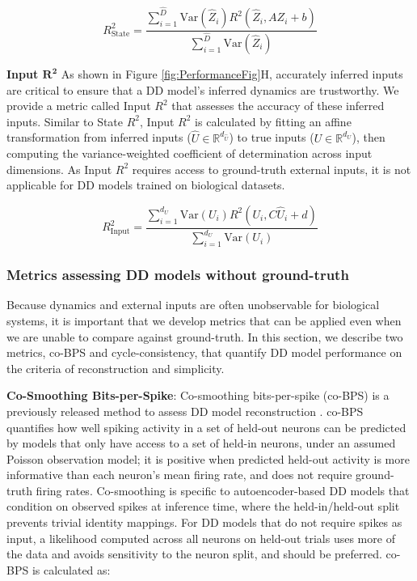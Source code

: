 \documentclass{article}
\begin{document}
\begin{equation}
R^2_{\text{State}} = \frac{\sum_{i=1}^{{\hat{D}}} \text{Var}(\hat{Z}_i) R^2(\hat{Z}_i, AZ_i + b)}{\sum_{i=1}^{{\hat{D}}} \text{Var}(\hat{Z}_i)}
\end{equation}

\textbf{Input $\boldsymbol{R^2}$} As shown in Figure \ref{fig:PerformanceFig}H, accurately inferred inputs are critical to ensure that a DD model’s inferred dynamics are trustworthy. We provide a metric called Input $R^2$ that assesses the accuracy of these inferred inputs. Similar to State $R^2$, Input $R^2$ is calculated by fitting an affine transformation from inferred inputs ($\hat{U} \in \mathbb{R}^{d_{\hat{U}}}$) to true inputs ($U \in \mathbb{R}^{d_U}$), then computing the variance-weighted coefficient of determination across input dimensions. As Input $R^2$ requires access to ground-truth external inputs, it is not applicable for DD models trained on biological datasets.

\begin{equation}
R^2_{\text{Input}} = \frac{\sum_{i=1}^{d_U} \text{Var}(U_i) R^2(U_i, C\hat{U}_i + d)}{\sum_{i=1}^{d_U} \text{Var}(U_i)}
\end{equation}


\subsubsection{Metrics assessing DD models without ground-truth \label{section:NonGTMetrics}}

Because dynamics and external inputs are often unobservable for biological systems, it is important that we develop metrics that can be applied even when we are unable to compare against ground-truth. In this section, we describe two metrics, co-BPS and cycle-consistency, that quantify DD model performance on the criteria of reconstruction and simplicity.

\textbf{Co-Smoothing Bits-per-Spike}:
Co-smoothing bits-per-spike (co-BPS) is a previously released method to assess DD model reconstruction \cite{pei_neural_2022}. co-BPS quantifies how well spiking activity in a set of held-out neurons can be predicted by models that only have access to a set of held-in neurons, under an assumed Poisson observation model; it is positive when predicted held-out activity is more informative than each neuron's mean firing rate, and does not require ground-truth firing rates. Co-smoothing is specific to autoencoder-based DD models that condition on observed spikes at inference time, where the held-in/held-out split prevents trivial identity mappings. For DD models that do not require spikes as input, a likelihood computed across all neurons on held-out trials uses more of the data and avoids sensitivity to the neuron split, and should be preferred. co-BPS is calculated as:
\end{document}

